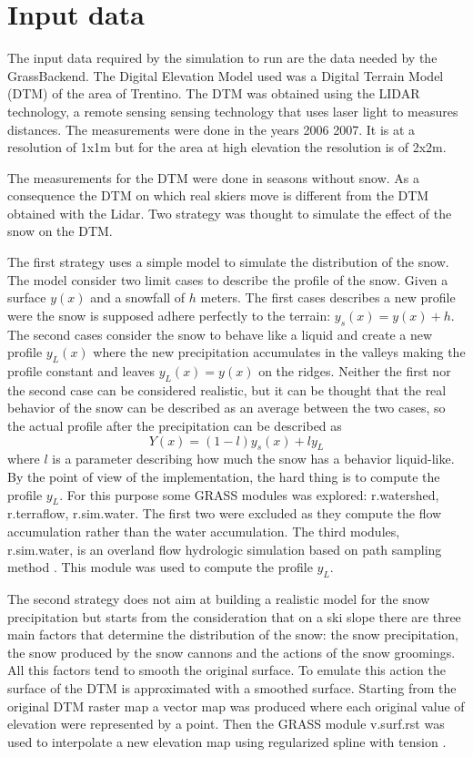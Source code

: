 \documentclass[12pt,a4paper,twoside]{book}
\begin{document}
\section{Input data}
The input data required by the simulation to run are the data needed by the GrassBackend. The Digital Elevation Model used was a Digital Terrain Model (DTM) of the area of Trentino. The DTM was obtained using the LIDAR technology, a remote sensing sensing technology that uses laser light to measures distances. The measurements were done in the years 2006 2007. It is at a resolution of 1x1m but for the area at high elevation the resolution is of 2x2m.

The measurements for the DTM were done in seasons without snow. As a consequence the DTM on which real skiers move is different from the DTM obtained with the Lidar. Two strategy was thought to simulate the effect of the snow on the DTM.

The first strategy uses a simple model to simulate the distribution of the snow. The model consider two limit cases to describe the profile of the snow. Given a surface $y(x)$ and a snowfall of $h$ meters. The first cases describes a new profile were the snow is supposed adhere perfectly to the terrain: $y_s(x)=y(x)+h$. The second cases consider the snow to behave like a liquid and create a new profile $y_L(x)$ where the new precipitation accumulates in the valleys making the profile constant and leaves $y_L(x)=y(x)$ on the ridges. Neither the first nor the second case can be considered realistic, but it can be thought that the real behavior of the snow can be described as an average between the two cases, so the actual profile after the precipitation can be described as
\begin{equation}
Y(x)=(1-l)y_s(x)+ly_L
\end{equation}
where $l$ is a parameter describing how much the snow has a behavior liquid-like. By the point of view of the implementation, the hard thing is to compute the profile $y_L$. For this purpose some GRASS modules was explored: r.watershed, r.terraflow, r.sim.water. The first two were excluded as they compute the flow accumulation rather than the water accumulation. The third modules, r.sim.water, is an overland flow hydrologic simulation based on path sampling method \cite{mit2004}. This module was used to compute the profile $y_L$.

The second strategy does not aim at building a realistic model for the snow precipitation but starts from the consideration that on a ski slope there are three main factors that determine the distribution of the snow: the snow precipitation, the snow produced by the snow cannons and the actions of the snow groomings. All this factors tend to smooth the original surface. To emulate this action the surface of the DTM is approximated with a smoothed surface. Starting from the original DTM raster map a vector map was produced where each original value of elevation were represented by a point. Then the GRASS module v.surf.rst was used to interpolate a new elevation map using regularized spline with tension \cite{mit2005}.
\end{document}
